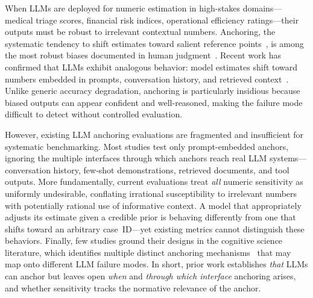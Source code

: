 When LLMs are deployed for numeric estimation in high-stakes
domains---medical triage scores, financial risk indices,
operational efficiency ratings---their outputs must be robust
to irrelevant contextual numbers.
Anchoring, the systematic tendency to shift estimates toward
salient reference points~\citep{tversky1974judgment}, is among
the most robust biases documented in human
judgment~\citep{kahneman2011thinking, chapman1999anchoring}.
Recent work has confirmed that LLMs exhibit analogous behavior:
model estimates shift toward numbers embedded in prompts,
conversation history, and retrieved
context~\citep{jones2022capturing, hagendorff2023humanlike,
echterhoff-etal-2024-cognitive, huang2025anchoring,
lou2024anchoring}.
Unlike generic accuracy degradation, anchoring is particularly
insidious because biased outputs can appear confident and
well-reasoned, making the failure mode difficult to detect
without controlled evaluation.

However, existing LLM anchoring evaluations are fragmented and
insufficient for systematic benchmarking.
Most studies test only prompt-embedded anchors, ignoring the
multiple interfaces through which anchors reach real LLM
systems---conversation history, few-shot demonstrations,
retrieved documents, and tool outputs.
More fundamentally, current evaluations treat \emph{all} numeric
sensitivity as uniformly undesirable, conflating irrational
susceptibility to irrelevant numbers with potentially rational
use of informative context.
A model that appropriately adjusts its estimate given a credible
prior is behaving differently from one that shifts toward an
arbitrary case~ID---yet existing metrics cannot distinguish
these behaviors.
Finally, few studies ground their designs in the cognitive
science literature, which identifies multiple distinct anchoring
mechanisms~\citep{epley2001putting, mussweiler1999hypothesis,
chapman1999anchoring} that may map onto different LLM failure
modes.
In short, prior work establishes \emph{that} LLMs can anchor
but leaves open \emph{when} and \emph{through which interface}
anchoring arises, and whether sensitivity tracks the
normative relevance of the anchor.

